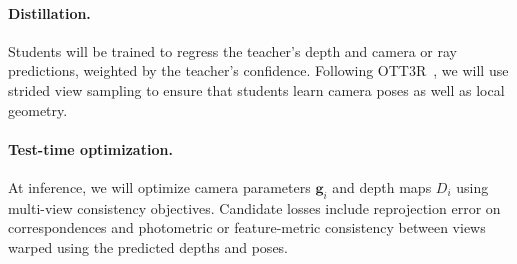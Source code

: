 \paragraph{Distillation.}
Students will be trained to regress the teacher's depth and camera or ray predictions, weighted by the teacher's confidence. Following OTT3R~\cite{ott3r}, we will use strided view sampling to ensure that students learn camera poses as well as local geometry.

\paragraph{Test-time optimization.}
At inference, we will optimize camera parameters $\mathbf{g}_i$ and depth maps $D_i$ using multi-view consistency objectives. Candidate losses include reprojection error on correspondences and photometric or feature-metric consistency between views warped using the predicted depths and poses.

